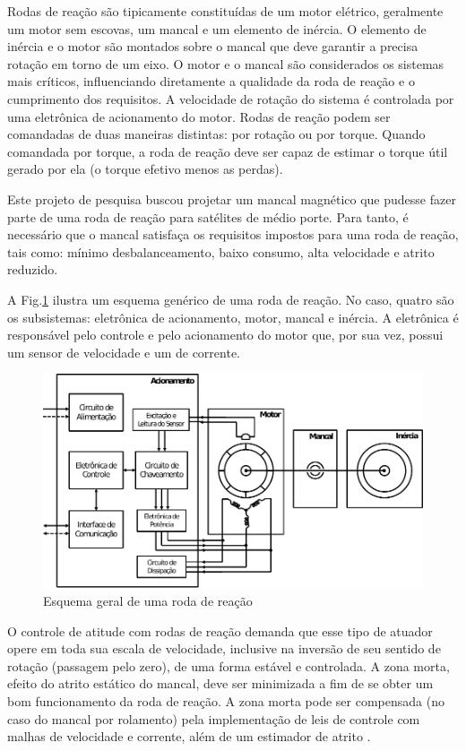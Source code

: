 Rodas de reação são tipicamente constituídas de um motor elétrico, geralmente um motor sem escovas, um mancal e um elemento de inércia.  O elemento de inércia e o motor são montados sobre o mancal que deve garantir a  precisa rotação em torno de um eixo. O motor e o mancal são considerados os sistemas mais críticos, influenciando diretamente a qualidade da roda de reação e o cumprimento dos requisitos. A velocidade de rotação do sistema é controlada por uma eletrônica de acionamento do motor. Rodas de reação podem ser comandadas de duas maneiras distintas: por rotação ou por torque. Quando comandada por torque, a roda de reação deve ser capaz de estimar o torque útil gerado por ela (o torque efetivo menos as perdas). 

Este projeto de pesquisa buscou projetar um mancal magnético que pudesse fazer parte de uma roda de reação para satélites de médio porte. Para tanto, é necessário que o mancal satisfaça os requisitos impostos para uma roda de reação, tais como: mínimo desbalanceamento, baixo consumo, alta velocidade e atrito reduzido.

A Fig.\ref{fig:EsquemaRoda} ilustra um esquema genérico de uma roda de reação. No caso, quatro são os subsistemas: eletrônica de acionamento, motor, mancal e inércia. A eletrônica é responsável pelo controle e pelo acionamento do motor que, por sua vez, possui um sensor de velocidade e um de corrente. 


\begin{figure}[ht!]
\centering
\includegraphics[width=1\linewidth]{./Figs/EsquemaRoda}
\caption{Esquema geral de uma roda de reação}
\label{fig:EsquemaRoda}
\end{figure}

O controle de atitude  com rodas de reação demanda que esse tipo de  atuador opere em toda sua escala de velocidade, inclusive na inversão de seu sentido de rotação (passagem pelo zero), de uma forma estável e controlada. A zona morta, efeito do atrito estático do mancal, deve ser minimizada a fim de se obter um bom funcionamento da roda de reação. A zona morta pode ser compensada (no caso do mancal por rolamento) pela implementação de leis de controle com malhas de velocidade e corrente, além de um estimador de atrito \citep{Carrara2010}.

